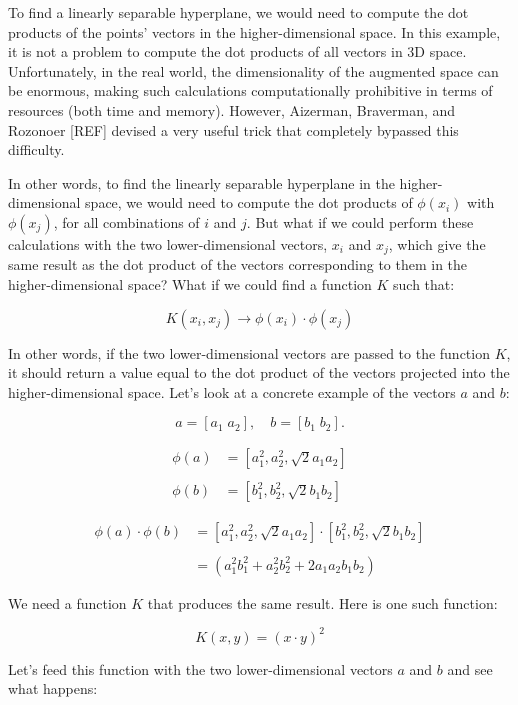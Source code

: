 \documentclass[11pt]{article}
\begin{document}
To find a linearly separable hyperplane, we would need to compute the
dot products of the points' vectors in the higher-dimensional space. In
this example, it is not a problem to compute the dot products of all
vectors in 3D space.\\
Unfortunately, in the real world, the dimensionality of the augmented
space can be enormous, making such calculations computationally
prohibitive in terms of resources (both time and memory). However,
Aizerman, Braverman, and Rozonoer {[}REF{]} devised a very useful trick
that completely bypassed this difficulty.

    In other words, to find the linearly separable hyperplane in the
higher-dimensional space, we would need to compute the dot products of
$\phi(x_i)$ with $\phi(x_j)$, for all combinations of $i$ and
$j$. But what if we could perform these calculations with the two
lower-dimensional vectors, $x_i$ and $x_j$, which give the same
result as the dot product of the vectors corresponding to them in the
higher-dimensional space? What if we could find a function $K$ such
that:

$$
K(x_i, x_j) \to \phi(x_i) \cdot \phi(x_j)
$$

In other words, if the two lower-dimensional vectors are passed to the
function $K$, it should return a value equal to the dot product of the
vectors projected into the higher-dimensional space. Let's look at a
concrete example of the vectors $a$ and $b$:

$$
a = [a_1 \; a_2], \quad b = [b_1 \; b_2].
$$

\begin{align*}
\phi(a) &= [a_1^2, a_2^2, \sqrt{2}a_1a_2] \\
& \\
\phi(b) &= [b_1^2, b_2^2, \sqrt{2}b_1b_2]
\end{align*}

\begin{align*}
\phi(a) \cdot \phi(b) &= [a_1^2, a_2^2, \sqrt{2}a_1a_2] \cdot [b_1^2, b_2^2, \sqrt{2}b_1b_2]\\
& \\
& = (a_1^2b_1^2 + a_2^2b_2^2 + 2a_1a_2b_1b_2)
\end{align*}

We need a function $K$ that produces the same result. Here is one such
function:

$$
K(x, y) = (x \cdot y)^2
$$

Let's feed this function with the two lower-dimensional vectors $a$
and $b$ and see what happens:
\end{document}

